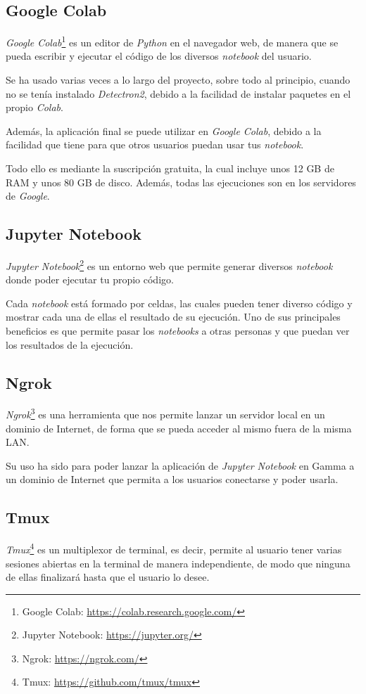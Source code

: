 \subsection{Google Colab}
\emph{Google Colab}\footnote{Google Colab: \url{https://colab.research.google.com/}} es un editor de \emph{Python} en el navegador web, de manera que se pueda escribir y ejecutar el código de los diversos \emph{notebook} del usuario. 

Se ha usado varias veces a lo largo del proyecto, sobre todo al principio, cuando no se tenía instalado \emph{Detectron2}, debido a la facilidad de instalar paquetes en el propio \emph{Colab}.

Además, la aplicación final se puede utilizar en \emph{Google Colab}, debido a la facilidad que tiene para que otros usuarios puedan usar tus \emph{notebook}.

Todo ello es mediante la suscripción gratuita, la cual incluye unos 12 GB de RAM y unos 80 GB de disco. Además, todas las ejecuciones son en los servidores de \emph{Google}.

\subsection{Jupyter Notebook}
\emph{Jupyter Notebook}\footnote{Jupyter Notebook: \url{https://jupyter.org/}} es un entorno web que permite generar diversos \emph{notebook} donde poder ejecutar tu propio código. 

Cada \emph{notebook} está formado por celdas, las cuales pueden tener diverso código y mostrar cada una de ellas el resultado de su ejecución. Uno de sus principales beneficios es que permite pasar los \emph{notebooks} a otras personas y que puedan ver los resultados de la ejecución.

\subsection{Ngrok}
\emph{Ngrok}\footnote{Ngrok: \url{https://ngrok.com/}} es una herramienta que nos permite lanzar un servidor local en un dominio de Internet, de forma que se pueda acceder al mismo fuera de la misma LAN. 

Su uso ha sido para poder lanzar la aplicación de \emph{Jupyter Notebook} en Gamma a un dominio de Internet que permita a los usuarios conectarse y poder usarla.

\subsection{Tmux}
\emph{Tmux}\footnote{Tmux: \url{https://github.com/tmux/tmux}} es un multiplexor de terminal, es decir, permite al usuario tener varias sesiones abiertas en la terminal de manera independiente, de modo que ninguna de ellas finalizará hasta que el usuario lo desee. 


